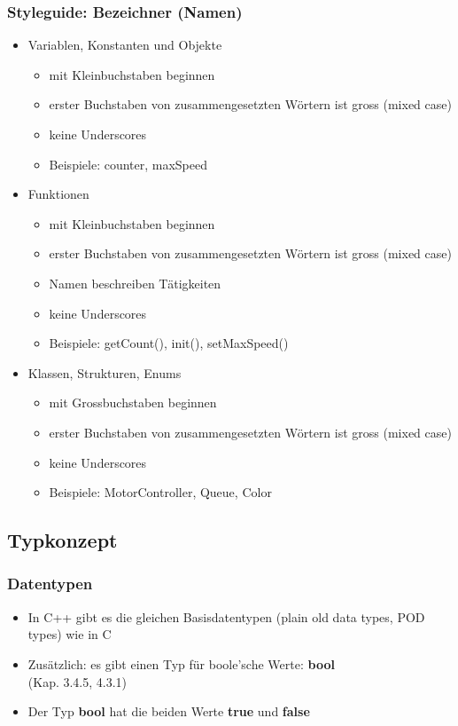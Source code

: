 \subsubsection{Styleguide: Bezeichner (\raisebox{-0.9ex}{\~{ }}Namen)\hfill}
\label{sec:Styleguide: Bezeichner}
\begin{itemize}
	\item Variablen, Konstanten und Objekte
	\begin{itemize}
		\item mit Kleinbuchstaben beginnen
		\item erster Buchstaben von zusammengesetzten Wörtern ist gross (mixed case)
		\item keine Underscores
		\\
		\item[\-] Beispiele: counter, maxSpeed
		\\
	\end{itemize}
	\item Funktionen
	\begin{itemize}
		\item mit Kleinbuchstaben beginnen
		\item erster Buchstaben von zusammengesetzten Wörtern ist gross (mixed case)
		\item Namen beschreiben Tätigkeiten
		\item keine Underscores
		\\
		\item[\-] Beispiele: getCount(), init(), setMaxSpeed()
		\\
	\end{itemize}
	\item Klassen, Strukturen, Enums
	\begin{itemize}
		\item mit Grossbuchstaben beginnen
		\item erster Buchstaben von zusammengesetzten Wörtern ist gross (mixed case)
		\item keine Underscores
		\\
		\item[\-] Beispiele: MotorController, Queue, Color
	\end{itemize}
\end{itemize}

\subsection{Typkonzept\hfill}
\label{sec:Typkonzept}

\subsubsection{Datentypen\hfill}
\label{sec:Datentypen}
\begin{itemize}
	\item In C++ gibt es die gleichen Basisdatentypen (plain old data types, POD types) wie in C
	\item Zusätzlich: es gibt einen Typ für boole'sche Werte: \textbf{bool}
		\\ \small{(Kap. 3.4.5, 4.3.1)}
	\item Der Typ \textbf{bool} hat die beiden Werte \textbf{true} und \textbf{false}
\end{itemize}

